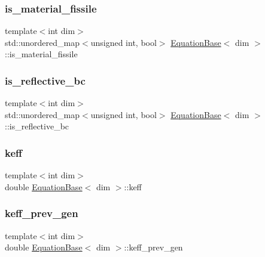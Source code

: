 \subsubsection{\texorpdfstring{is\+\_\+material\+\_\+fissile}{is\_material\_fissile}}
{\footnotesize\ttfamily template$<$int dim$>$ \\
std\+::unordered\+\_\+map$<$unsigned int, bool$>$ \hyperlink{class_equation_base}{Equation\+Base}$<$ dim $>$\+::is\+\_\+material\+\_\+fissile\hspace{0.3cm}{\ttfamily [protected]}}

\mbox{\label{class_equation_base_a91757532b2fd3759a976b22a83a9f8d8}} 
\subsubsection{\texorpdfstring{is\+\_\+reflective\+\_\+bc}{is\_reflective\_bc}}
{\footnotesize\ttfamily template$<$int dim$>$ \\
std\+::unordered\+\_\+map$<$unsigned int, bool$>$ \hyperlink{class_equation_base}{Equation\+Base}$<$ dim $>$\+::is\+\_\+reflective\+\_\+bc\hspace{0.3cm}{\ttfamily [protected]}}

\mbox{\label{class_equation_base_ab3cf94dc329f486555f89bdb0dd94ed6}} 
\subsubsection{\texorpdfstring{keff}{keff}}
{\footnotesize\ttfamily template$<$int dim$>$ \\
double \hyperlink{class_equation_base}{Equation\+Base}$<$ dim $>$\+::keff\hspace{0.3cm}{\ttfamily [protected]}}

\mbox{\label{class_equation_base_a80de7bca9496a5739f842ed154ecd274}} 
\subsubsection{\texorpdfstring{keff\+\_\+prev\+\_\+gen}{keff\_prev\_gen}}
{\footnotesize\ttfamily template$<$int dim$>$ \\
double \hyperlink{class_equation_base}{Equation\+Base}$<$ dim $>$\+::keff\+\_\+prev\+\_\+gen\hspace{0.3cm}{\ttfamily [protected]}}

